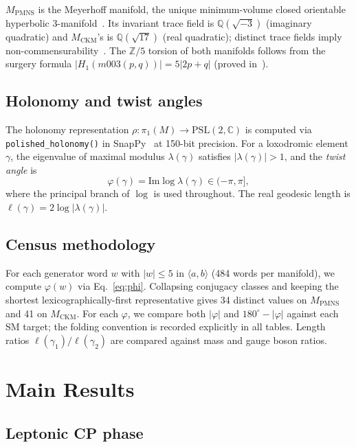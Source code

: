 \documentclass[11pt,a4paper]{article}
\theoremstyle{definition}
\theoremstyle{remark}
\newcommand{\PSL}{\mathrm{PSL}(2,\mathbb{C})}
\newcommand{\ZZ}{\mathbb{Z}}
\newcommand{\QQ}{\mathbb{Q}}
\newcommand{\MPMNS}{M_{\mathrm{PMNS}}}
\newcommand{\MCKM}{M_{\mathrm{CKM}}}
\newcommand{\degr}{^{\circ}}
\begin{document}
$\MPMNS$ is the Meyerhoff manifold, the unique minimum-volume closed
orientable hyperbolic 3-manifold~\cite{GMM}.
Its invariant trace field is $\QQ(\sqrt{-3})$ (imaginary quadratic)
and $\MCKM$'s is $\QQ(\sqrt{17})$ (real quadratic);
distinct trace fields imply non-commensurability~\cite{MaclachlanReid}.
The $\ZZ/5$ torsion of both manifolds follows from the surgery formula
$|H_1(m003(p,q))| = 5|2p+q|$ (proved in~\cite{Gentry:Unified}).

\subsection{Holonomy and twist angles}

The holonomy representation $\rho:\pi_1(M)\to\PSL$ is computed via
\texttt{polished\_holonomy()} in SnapPy~\cite{SnapPy} at 150-bit precision.
For a loxodromic element $\gamma$, the eigenvalue of maximal modulus
$\lambda(\gamma)$ satisfies $|\lambda(\gamma)| > 1$, and the
\emph{twist angle} is
\begin{equation}
  \varphi(\gamma) = \mathrm{Im}\log\lambda(\gamma) \in (-\pi,\pi],
  \label{eq:phi}
\end{equation}
where the principal branch of $\log$ is used throughout.
The real geodesic length is $\ell(\gamma) = 2\log|\lambda(\gamma)|$.

\subsection{Census methodology}

For each generator word $w$ with $|w|\leq 5$ in $\langle a,b\rangle$
(484 words per manifold), we compute $\varphi(w)$ via
Eq.~\eqref{eq:phi}.
Collapsing conjugacy classes and keeping the shortest lexicographically-first
representative gives 34 distinct values on $\MPMNS$ and 41 on $\MCKM$.
For each $\varphi$, we compare both $|\varphi|$ and
$180\degr - |\varphi|$ against each SM target; the folding convention is
recorded explicitly in all tables.
Length ratios $\ell(\gamma_1)/\ell(\gamma_2)$ are compared against mass and
gauge boson ratios.

\section{Main Results}
\label{sec:results}

\subsection{Leptonic CP phase}
\label{sec:cp}
\end{document}
